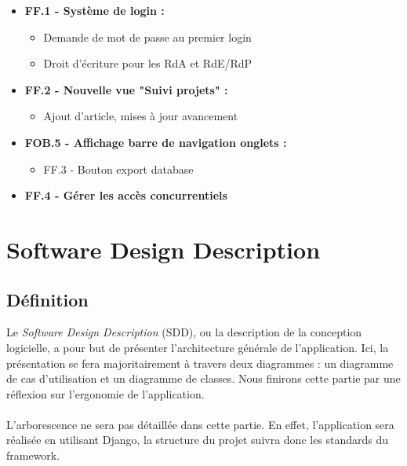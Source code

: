 \documentclass[french]{report}
\begin{document}
\begin{itemize}[label=\textbullet, font=\normalfont \color{blue}]
  \item{\textbf{FF.1 - Système de login :}}

  \begin{itemize}[label=\textbullet]
    \item{Demande de mot de passe au premier login}
    \item{Droit d'écriture pour les RdA et RdE/RdP}
  \end{itemize}

  \item{\textbf{FF.2 - Nouvelle vue "Suivi projets" :}}

  \begin{itemize}[label=\textbullet]
    \item{Ajout d'article, mises à jour avancement}
  \end{itemize}

  \item{\textbf{FOB.5 - Affichage barre de navigation onglets : }}

  \begin{itemize}[label=\textbullet]
    \item {FF.3 - Bouton export database}
  \end{itemize}

  \item{\textbf{FF.4 - Gérer les accès concurrentiels}}

\end{itemize}


\chapter{Software Design Description}
  \section{Définition}

  Le \emph{Software Design Description} (SDD), ou la description de la conception
  logicielle, a pour but de présenter l'architecture générale de
  l’application. Ici, la présentation se fera majoritairement à travers deux
  diagrammes : un diagramme de cas d’utilisation et un diagramme de classes. Nous
  finirons cette partie par une réflexion sur l’ergonomie de l’application.\\\\
  L’arborescence ne sera pas détaillée dans cette partie. En effet, l’application
  sera réalisée en utilisant Django, la structure du projet suivra donc les
  standards du framework.
\end{document}
